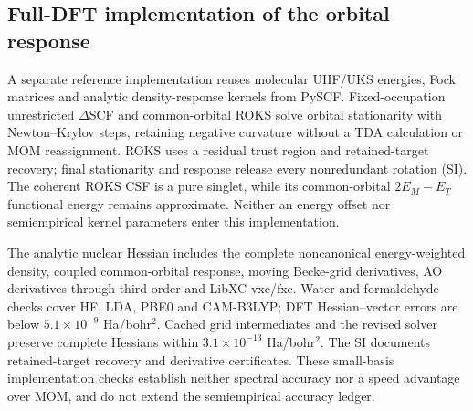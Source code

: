 \subsection{Full-DFT implementation of the orbital response}
A separate reference implementation reuses molecular UHF/UKS energies,
Fock matrices and analytic density-response kernels from PySCF.\cite{sun2020pyscf}
Fixed-occupation unrestricted $\Delta$SCF and common-orbital ROKS solve
orbital stationarity with Newton--Krylov steps, retaining negative
curvature without a TDA calculation or MOM reassignment. ROKS uses a residual trust region and retained-target recovery;
final stationarity and response release every nonredundant rotation (SI). The
coherent ROKS CSF is a pure singlet, while its common-orbital
$2E_M-E_T$ functional energy remains approximate. Neither an energy
offset nor semiempirical kernel parameters enter this implementation.

The analytic nuclear Hessian includes the complete noncanonical
energy-weighted density, coupled common-orbital response, moving
Becke-grid derivatives, AO derivatives through third order and LibXC
vxc/fxc. Water and formaldehyde checks cover HF, LDA, PBE0 and CAM-B3LYP;
DFT Hessian--vector errors are below $5.1\times10^{-9}$ Ha/bohr$^2$.
Cached grid intermediates and the revised solver preserve complete
Hessians within $3.1\times10^{-13}$ Ha/bohr$^2$. The SI documents
retained-target recovery and derivative certificates. These small-basis
implementation checks establish neither spectral accuracy nor a speed
advantage over MOM, and do not extend the semiempirical accuracy ledger.
